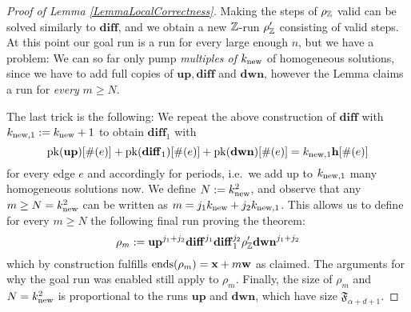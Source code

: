 \begin{proof}[Proof of Lemma \ref{LemmaLocalCorrectness}]
Making the steps of \(\rho_{\mathbb{Z}}\) valid can be solved similarly to \(\mathbf{diff}\), and we obtain a new \(\mathbb{Z}\)-run \(\rho_{\mathbb{Z}}'\) consisting of valid steps. At this point our goal run is a run for every large enough \(n\), but we have a problem: We can so far only pump \emph{multiples of} \(k_{\text{new}}\) of homogeneous solutions, since we have to add full copies of \(\mathbf{up}, \mathbf{diff}\) and \(\mathbf{dwn}\), however the Lemma claims a run for \emph{every} \(m \geq N\). 

The last trick is the following: We repeat the above construction of \(\mathbf{diff}\) with \(k_{\text{new},1}:=k_{\text{new}}+1\) to obtain \(\mathbf{diff}_1\) with 
\[\operatorname{pk}(\mathbf{up})[\#(e)]+\operatorname{pk}(\mathbf{diff}_1)[\#(e)]+\operatorname{pk}(\mathbf{dwn})[\#(e)]=k_{\text{new},1} \mathbf{h}[\#(e)]\]
 for every edge \(e\) and accordingly for periods, i.e.\ we add up to \(k_{\text{new},1}\) many homogeneous solutions now. We define \(N:=k_{\text{new}}^2\), and observe that any \(m \geq N=k_{\text{new}}^2\) can be written as \(m=j_1 k_{\text{new}} + j_2 k_{\text{new},1}\). This allows us to define for every \(m \geq N\) the following final run proving the theorem:
 \[\rho_m:=\mathbf{up}^{j_1+j_2} \mathbf{diff}^{j_1} \mathbf{diff}_1^{j_2} \rho_{\mathbb{Z}}' \mathbf{dwn}^{j_1+j_2} \]
which by construction fulfills \(\operatorname{ends}(\rho_m)=\mathbf{x}+m \mathbf{w}\) as claimed. The arguments for why the goal run was enabled still apply to \(\rho_m\). Finally, the size of \(\rho_m\) and \(N=k_{\text{new}}^2\) is proportional to the runs \(\mathbf{up}\) and \(\mathbf{dwn}\), which have size \(\mathfrak{F}_{\alpha+d+1}\).
\end{proof}
































